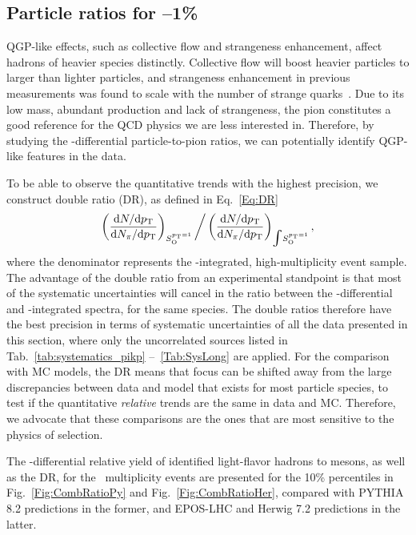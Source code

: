 \subsection{Particle ratios for --1\%}\label{Sec:ResRat}

QGP-like effects, such as collective flow and strangeness enhancement, affect hadrons of heavier species distinctly. Collective flow will boost heavier particles to larger \pt than lighter particles, and strangeness enhancement in previous measurements was found to scale with the number of strange quarks~\cite{Naturepaper}\cite{alice_newstrangeness}. Due to its low mass, abundant production and lack of strangeness, the pion constitutes a good reference for the QCD physics we are less interested in. Therefore, by studying the \pt-differential particle-to-pion ratios, we can potentially identify QGP-like features in the data.

To be able to observe the quantitative trends with the highest precision, we construct double ratio (DR), as defined in Eq.~\ref{Eq:DR}
\begin{equation}\label{Eq:DR}
\centering
    \left(\frac{{\rm d}N/{\rm d}\pt}{{\rm d}N_\PI/{\rm d}\pt}\right)_{\SOPT} \bigg/ \left(\frac{{\rm d}N/ {\rm d}\pt}{{\rm d}N_\PI/{\rm d}\pt}\right)_{\scaleto{\int}{15pt}\SOPT},
\end{equation}
where the denominator represents the \SOPT-integrated, high-multiplicity event sample. The advantage of the double ratio from an experimental standpoint is that most of the systematic uncertainties will cancel in the ratio between the \SOPT-differential and \SOPT-integrated spectra, for the same species. The double ratios therefore have the best precision in terms of systematic uncertainties of all the data presented in this section, where only the uncorrelated sources listed in Tab.~\ref{tab:systematics_pikp} --~\ref{Tab:SysLong} are applied. For the comparison with MC models, the DR means that focus can be shifted away from the large discrepancies between data and model that exists for most particle species, to test if the quantitative \textit{relative} trends are the same in data and MC. Therefore, we advocate that these comparisons are the ones that are most sensitive to the physics of \SOPT selection.


The \pt-differential relative yield of identified light-flavor hadrons to \PI mesons, as well as the DR, for the \tracklet \topone~multiplicity events are presented for the 10\% \SOPT percentiles in Fig.~\ref{Fig:CombRatioPy} and Fig.~\ref{Fig:CombRatioHer}, compared with PYTHIA 8.2 predictions in the former, and EPOS-LHC and Herwig 7.2 predictions in the latter. 

